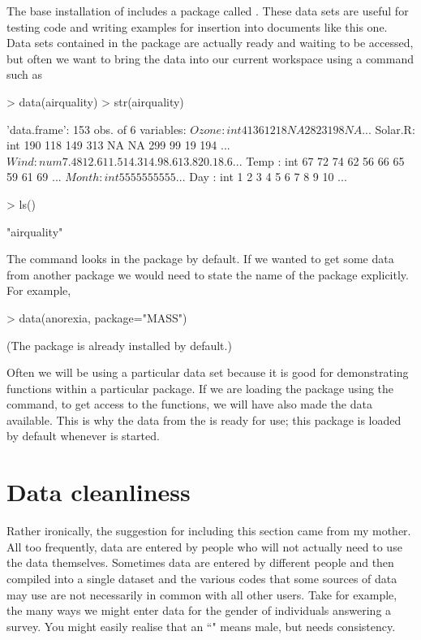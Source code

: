 The base installation of \R{} includes a package called . These data sets are useful for testing code and writing examples for insertion into documents like this one. Data sets contained in the  package are actually ready and waiting to be accessed, but often we want to bring the data into our current workspace using a command such as
\begin{Schunk}
\begin{Sinput}
> data(airquality)
> str(airquality)
\end{Sinput}
\begin{Soutput}
'data.frame':	153 obs. of  6 variables:
 $ Ozone  : int  41 36 12 18 NA 28 23 19 8 NA ...
 $ Solar.R: int  190 118 149 313 NA NA 299 99 19 194 ...
 $ Wind   : num  7.4 8 12.6 11.5 14.3 14.9 8.6 13.8 20.1 8.6 ...
 $ Temp   : int  67 72 74 62 56 66 65 59 61 69 ...
 $ Month  : int  5 5 5 5 5 5 5 5 5 5 ...
 $ Day    : int  1 2 3 4 5 6 7 8 9 10 ...
\end{Soutput}
\begin{Sinput}
> ls()
\end{Sinput}
\begin{Soutput}
[1] "airquality"
\end{Soutput}
\end{Schunk}
The  command looks in the  package by default. If we wanted to get some data from another package we would need to state the name of the package explicitly. For example,
\begin{Schunk}
\begin{Sinput}
> data(anorexia, package="MASS")
\end{Sinput}
\end{Schunk}
(The  package is already installed by default.) 

Often we will be using a particular data set because it is good for demonstrating functions within a particular package. If we are loading the package using the  command, to get access to the functions, we will have also made the data available. This is why the data from the  is ready for use; this package is loaded by default whenever \R{} is started.


\section{Data cleanliness}

Rather ironically, the suggestion for including this section came from my mother. All too frequently, data are entered by people who will not actually need to use the data themselves. Sometimes data are entered by different people and then compiled into a single dataset and the various codes that some sources of data may use are not necessarily in common with all other users. Take for example, the many ways we might enter data for the gender of individuals answering a survey. You might easily realise that an ``" means male, but \R{} needs consistency.


